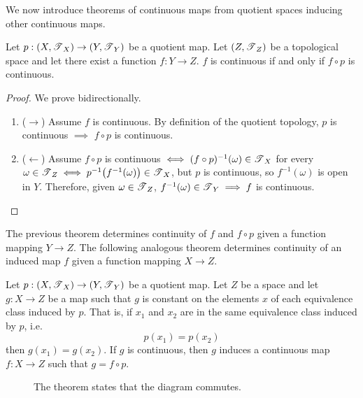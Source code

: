   We now introduce theorems of continuous maps from quotient spaces inducing other continuous maps. 

  \begin{theorem}
    Let $p: (X, \operatorname{\mathscr{T}}_X) \rightarrow (Y, \operatorname{\mathscr{T}}_Y)$ be a quotient map. Let $(Z, \operatorname{\mathscr{T}}_Z)$ be a topological space and let there exist a function $f: Y \rightarrow Z$. $f$ is continuous if and only if $f \circ p$ is continuous. 

    \begin{figure}[H]
      \centering 
      \label{fig:decomposition_of_continuous}
    \end{figure}

  \end{theorem}
  \begin{proof}
    We prove bidirectionally. 
    \begin{enumerate}
      \item ($\rightarrow$) Assume $f$ is continuous. By definition of the quotient topology, $p$ is continuous $\implies$ $f \circ p$ is continuous. 
      \item ($\leftarrow$) Assume $f \circ p$ is continuous $\iff (f \circ p)^{-1} (\omega) \in \operatorname{\mathscr{T}}_X$ for every $\omega \in \operatorname{\mathscr{T}}_Z \iff p^{-1} \big( f^{-1}(\omega) \big) \in \operatorname{\mathscr{T}}_X$, but $p$ is continuous, so $f^{-1}(\omega)$ is open in $Y$. Therefore, given $\omega \in \operatorname{\mathscr{T}}_{Z}$, $f^{-1} (\omega) \in \operatorname{\mathscr{T}}_Y \implies f$ is continuous. 
    \end{enumerate}
  \end{proof}

  The previous theorem determines continuity of $f$ and $f \circ p$ given a function mapping $Y \rightarrow Z$. The following analogous theorem determines continuity of an induced map $f$ given a function mapping $X \rightarrow Z$. 

  \begin{theorem}
    Let $p: (X, \operatorname{\mathscr{T}}_X )\rightarrow (Y, \operatorname{\mathscr{T}}_Y)$ be a quotient map. Let $Z$ be a space and let $g: X \rightarrow Z$ be a map such that $g$ is constant on the elements $x$ of each equivalence class induced by $p$. That is, if $x_1$ and $x_2$ are in the same equivalence class induced by $p$, i.e. 
    \begin{equation}
      p(x_1) = p(x_2)
    \end{equation}
    then $g(x_1) = g(x_2)$. If $g$ is continuous, then $g$ induces a continuous map $f: X \rightarrow Z$ such that $g = f \circ p$. 

    \begin{figure}[H]
      \centering 
      \caption{The theorem states that the diagram commutes. } 
      \label{fig:quotient_continuity}
    \end{figure}

  \end{theorem}

